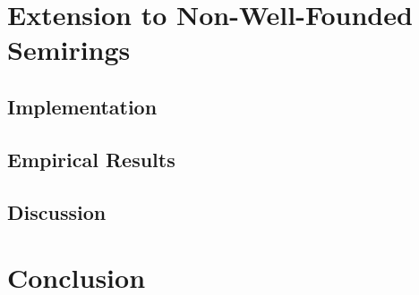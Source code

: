 \documentclass{report}
\begin{document}
     
  
\section{Extension to Non-Well-Founded Semirings}

 

\subsection{Implementation}
\label{nwf:sec:type_graph:implementation}
 

\subsection{Empirical Results}
\label{nwf:sec:type_graph:result}
 

\subsection{Discussion}
\label{nwf:sec:type_graph:related_work}


\section{Conclusion}
\label{nwf:sec:type_graph:conclusion}



% 

% 
\end{document}
